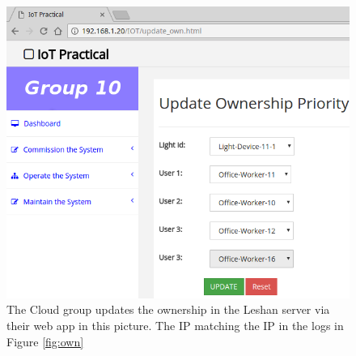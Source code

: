 \documentclass[11pt]{article}
\begin{document}
\begin{figure}[h!]
	\begin{center}
		\includegraphics[width=.6\linewidth]{img/screenshot-cloud-ownership}
		\caption{The Cloud group updates the ownership in the Leshan server via their web app in this picture. The IP matching the IP in the logs in Figure \ref{fig:own}}
		\label{fig:cloudown}
	\end{center}
\end{figure}
\end{document}
